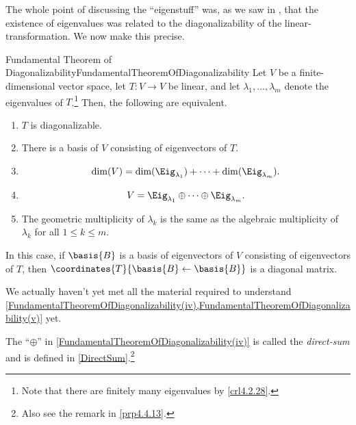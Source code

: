 The whole point of discussing the ``eigenstuff'' was, as we saw in , that the existence of eigenvalues was related to the diagonalizability of the linear-transformation.  We now make this precise.
\begin{thm}{Fundamental Theorem of Diagonalizability}{FundamentalTheoremOfDiagonalizability}
	Let $V$ be a finite-dimensional vector space, let $T\colon V\rightarrow V$ be linear, and let $\lambda _1,\ldots ,\lambda _m$ denote the eigenvalues of $T$.\footnote{Note that there are finitely many eigenvalues by \cref{crl4.2.28}.}  Then, the following are equivalent.
	\begin{enumerate}
		\item \label{FundamentalTheoremOfDiagonalizability(i)}$T$ is diagonalizable.
		\item \label{FundamentalTheoremOfDiagonalizability(ii)}There is a basis of $V$ consisting of eigenvectors of $T$.
		\item \label{FundamentalTheoremOfDiagonalizability(iii)}
		\begin{equation}
			\dim (V)=\dim (\Eig _{\lambda _1})+\cdots +\dim (\Eig _{\lambda _m}).
		\end{equation}
		\item \label{FundamentalTheoremOfDiagonalizability(iv)}
		\begin{equation}
			V=\Eig _{\lambda _1}\oplus \cdots \oplus \Eig _{\lambda _m}.
		\end{equation}
		\item \label{FundamentalTheoremOfDiagonalizability(v)}The geometric multiplicity of $\lambda _k$ is the same as the algebraic multiplicity of $\lambda _k$ for all $1\leq k\leq m$.
	\end{enumerate}
	In this case, if $\basis{B}$ is a basis of eigenvectors of $V$ consisting of eigenvectors of $T$, then $\coordinates{T}{\basis{B}\leftarrow \basis{B}}$ is a diagonal matrix.
	\begin{rmk}
		We actually haven't yet met all the material required to understand \cref{FundamentalTheoremOfDiagonalizability(iv),FundamentalTheoremOfDiagonalizability(v)} yet.
		
		The ``$\oplus$'' in \cref{FundamentalTheoremOfDiagonalizability(iv)} is called the \emph{direct-sum} and is defined in \cref{DirectSum}.\footnote{Also see the remark in \cref{prp4.4.13}.}
		

\end{rmk}
\end{thm}
